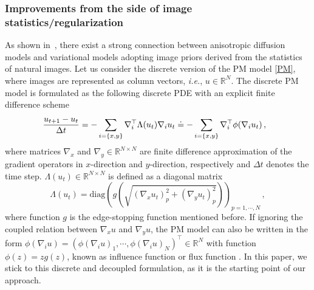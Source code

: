 \documentclass[10pt,journal,compsoc]{IEEEtran}
\newcommand{\R}{\mathbb{R}}
\newcommand{\suml}[2]{\sum\limits_{#1}^{#2}}
\newcommand{\ie}{\emph{i.e.}}
\begin{document}
{\begin{comment}
Unfortunately, at present \cite{liu2010learning} is the sole previous work we can find in this direction. 
The basic idea of our approach is similar to \cite{liu2010learning}, but 
our proposed model will be much 
more expressive. More details are presented in Section \ref{relations}. 
\end{comment}

\subsubsection{Improvements from the side of image statistics/regularization}
\label{improvements}
As shown in~\cite{relations, biased, KrajsekS10, ScharrBH03}, 
there exist a strong connection between anisotropic diffusion models and 
variational models adopting image priors derived from the statistics of natural images. 
Let us consider the discrete version of the PM model \eqref{PM}, where
images are represented as column vectors, \ie, $u \in
\R^{N}$. The discrete PM model is formulated as the following 
discrete PDE with an explicit finite difference scheme
\begin{equation}\label{pmmodel}
  \hspace*{-0.3cm}\frac{u_{t+1} - u_t}{\Delta t} = -\suml{i = \{x,y\}}{}\nabla_i^\top \Lambda (u_t) \nabla_i u_t
  \doteq -\suml{i = \{x,y\}}{}\nabla_i^\top \phi(\nabla_i u_t) \,,
\end{equation}
where matrices $\nabla_x$ and $\nabla_y \in \R^{N \times N}$ are
finite difference approximation of the gradient operators in
$x$-direction and $y$-direction, respectively and $\Delta t$ denotes
the time step. $\Lambda(u_t) \in \R^{N \times N}$ is defined as a
diagonal matrix
\[
\Lambda(u_t) = \text{diag}\left( g\left(\sqrt{(\nabla_x u_t)^2_p +
      (\nabla_y u_t)^2_p}\right)\right)_{p = 1, \cdots, N}\,,
\]
where function $g$ is the edge-stopping function mentioned before. 
If ignoring the coupled relation between $\nabla_x u$
and $\nabla_y u$, the PM model can also be written in the form $\phi(\nabla_i u)
= \left( \phi(\nabla_i u)_1, \cdots, \phi(\nabla_i u)_N \right)^\top
\in \R^N$ with function $\phi(z) = zg(z)$, known as influence function
\cite{ROBUSTANISOTROPIC} or flux function \cite{anisotropicbook}.  
In this paper, we stick to this discrete and decoupled formulation, 
as it is the starting point of our approach. 

}
\end{document}
